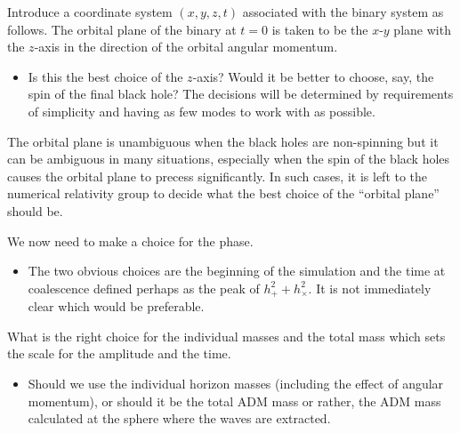 \documentclass{article}
\numberwithin{equation}{section}
\begin{document}
Introduce a coordinate system $(x,y,z,t)$ associated with the binary
system as follows.  The orbital plane of the binary at $t=0$ is taken
to be the $x$-$y$ plane with the $z$-axis in the direction of the
orbital angular momentum. 
\begin{itemize}
\item Is this the best choice of the $z$-axis?  Would it be better to
  choose, say, the spin of the final black hole? The decisions will be
  determined by requirements of simplicity and having as few modes to
  work with as possible.  
\end{itemize}
The orbital plane is unambiguous when the black holes are non-spinning
but it can be ambiguous in many situations, especially when the spin
of the black holes causes the orbital plane to precess significantly.
In such cases, it is left to the numerical relativity group to decide
what the best choice of the ``orbital plane'' should be.

We now need to make a choice for the phase. 
\begin{itemize}
\item The two obvious choices are the beginning of the simulation and
  the time at coalescence defined perhaps as the peak of $h_+^2 +
  h_\times^2$.  It is not immediately clear which would be preferable.
\end{itemize}
What is the right choice for the individual masses and the total mass
which sets the scale for the amplitude and the time.
\begin{itemize}
\item Should we use the individual horizon masses (including the
  effect of angular momentum), or should it be the total ADM mass or
  rather, the ADM mass calculated at the sphere where the waves are
  extracted.  
\end{itemize}
\end{document}

